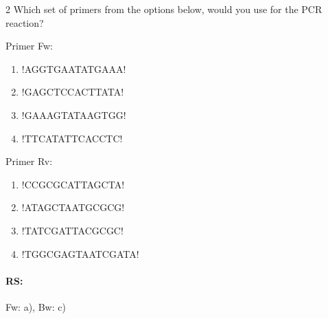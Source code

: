 \documentclass[\mainfilename]{subfiles}
\begin{document}
\begin{questionBox}2{ %
    Which set of primers from the options below, would you use for the PCR reaction?
} %
    \begin{multicols}{2}
        \renewcommand\DNAblock{5}
        \begin{minipage}{\textwidth}
            Primer Fw:
            \begin{enumerate}
                \item \hspace{-16.5em}\DNA!AGGTGAATATGAAA!
                \item \hspace{-16.5em}\DNA!GAGCTCCACTTATA!
                \item \hspace{-16.5em}\DNA!GAAAGTATAAGTGG!
                \item \hspace{-16.5em}\DNA!TTCATATTCACCTC!
            \end{enumerate}
        \end{minipage}

        \begin{minipage}{1\textwidth}
            Primer Rv:
            \begin{enumerate}
                \item \hspace{-16.5em}\DNA!CCGCGCATTAGCTA!
                \item \hspace{-16.5em}\DNA!ATAGCTAATGCGCG!
                \item \hspace{-16.5em}\DNA!TATCGATTACGCGC!
                \item \hspace{-16.5em}\DNA!TGGCGAGTAATCGATA!
            \end{enumerate}
        \end{minipage}
    \end{multicols}

    \paragraph{RS:} Fw: a), Bw: c)
\end{questionBox}
\end{document}
